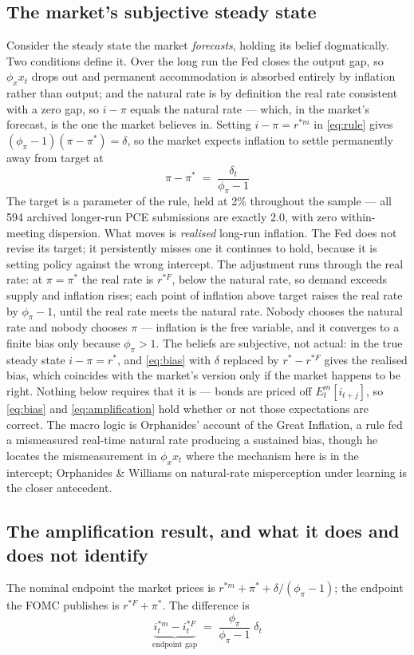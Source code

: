 \documentclass[11pt]{article}
\begin{document}
\subsection{The market's subjective steady state}
Consider the steady state the market \emph{forecasts}, holding its belief dogmatically. Two
conditions define it. Over the long run the Fed closes the output gap, so $\phi_x x_t$ drops out
and permanent accommodation is absorbed entirely by inflation rather than output; and the
natural rate is by definition the real rate consistent with a zero gap, so $i-\pi$ equals the
natural rate --- which, in the market's forecast, is the one the market believes in. Setting
$i-\pi = r^{*m}$ in \eqref{eq:rule} gives $(\phi_\pi-1)(\pi-\pi^{*}) = \delta$, so the market
expects inflation to settle permanently away from target at
\begin{equation}
\boxed{\;\pi - \pi^{*} \;=\; \frac{\delta_t}{\phi_\pi - 1}\;}
\label{eq:bias}
\end{equation}
The target is a parameter of the rule, held at 2\% throughout the sample --- all 594 archived
longer-run PCE submissions are exactly 2.0, with zero within-meeting dispersion. What moves is
\emph{realised} long-run inflation. The Fed does not revise its target; it persistently misses
one it continues to hold, because it is setting policy against the wrong intercept. The
adjustment runs through the real rate: at $\pi=\pi^{*}$ the real rate is $r^{*F}$, below the
natural rate, so demand exceeds supply and inflation rises; each point of inflation above target
raises the real rate by $\phi_\pi-1$, until the real rate meets the natural rate. Nobody chooses
the natural rate and nobody chooses $\pi$ --- inflation is the free variable, and it converges
to a finite bias only because $\phi_\pi>1$.
The beliefs are subjective, not actual: in the true steady state $i-\pi=r^{*}$, and
\eqref{eq:bias} with $\delta$ replaced by $r^{*}-r^{*F}$ gives the realised bias, which
coincides with the market's version only if the market happens to be right. Nothing below
requires that it is --- bonds are priced off $E^{m}_t[i_{t+j}]$, so \eqref{eq:bias} and
\eqref{eq:amplification} hold whether or not those expectations are correct. The macro logic is
Orphanides' account of the Great Inflation, a rule fed a mismeasured real-time natural rate
producing a sustained bias, though he locates the mismeasurement in $\phi_x x_t$ where the
mechanism here is in the intercept; Orphanides \& Williams on natural-rate misperception under
learning is the closer antecedent.
\subsection{The amplification result, and what it does and does not identify}
The nominal endpoint the market prices is $r^{*m} + \pi^{*} + \delta/(\phi_\pi-1)$; the endpoint
the FOMC publishes is $r^{*F} + \pi^{*}$. The difference is
\begin{equation}
\boxed{\;\underbrace{i^{*m}_t - i^{*F}_t}_{\text{endpoint gap}} \;=\; \frac{\phi_\pi}{\phi_\pi-1}\;\delta_t\;}
\label{eq:amplification}
\end{equation}
\end{document}
